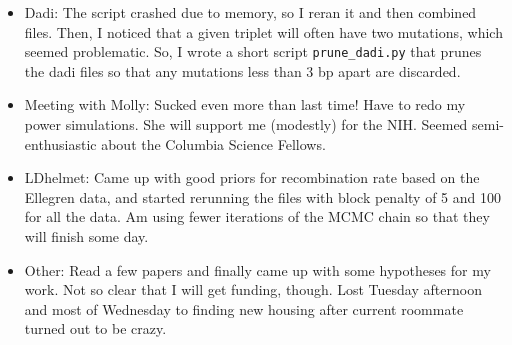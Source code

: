 \documentclass[idxtotoc,hyperref,openany,oneside]{labbook} %
\begin{document}
\begin{itemize}
\item Dadi: The script crashed due to memory, so I reran it and then combined files. Then, I noticed that a given triplet will often have two mutations, which seemed problematic. So, I wrote a short script \verb+prune_dadi.py+ that prunes the dadi files so that any mutations less than 3 bp apart are discarded.
\item Meeting with Molly: Sucked even more than last time! Have to redo my power simulations. She will support me (modestly) for the NIH. Seemed semi-enthusiastic about the Columbia Science Fellows.
\item LDhelmet: Came up with good priors for recombination rate based on the Ellegren data, and started rerunning the files with block penalty of 5 and 100 for all the data. Am using fewer iterations of the MCMC chain so that they will finish some day.
\item Other: Read a few papers and finally came up with some hypotheses for my work. Not so clear that I will get funding, though. Lost Tuesday afternoon and most of Wednesday to finding new housing after current roommate turned out to be crazy.
\end{itemize}
\end{document}
